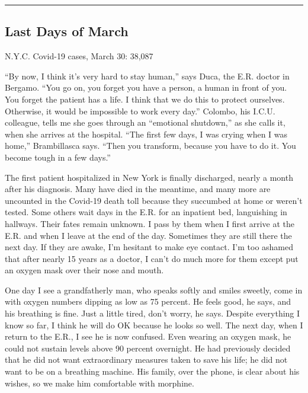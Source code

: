 \begin{center}\rule{0.5\linewidth}{\linethickness}\end{center}

\hypertarget{last-days-of-march}{%
\subsection{Last Days of March}\label{last-days-of-march}}

N.Y.C. Covid-19 cases, March 30: 38,087

``By now, I think it's very hard to stay human,'' says Duca, the E.R.
doctor in Bergamo. ``You go on, you forget you have a person, a human in
front of you. You forget the patient has a life. I think that we do this
to protect ourselves. Otherwise, it would be impossible to work every
day.'' Colombo, his I.C.U. colleague, tells me she goes through an
``emotional shutdown,'' as she calls it, when she arrives at the
hospital. ``The first few days, I was crying when I was home,''
Brambillasca says. ``Then you transform, because you have to do it. You
become tough in a few days.''

The first patient hospitalized in New York is finally discharged, nearly
a month after his diagnosis. Many have died in the meantime, and many
more are uncounted in the ­Covid-19 death toll because they succumbed at
home or weren't tested. Some others wait days in the E.R. for an
inpatient bed, languishing in hallways. Their fates remain unknown. I
pass by them when I first arrive at the E.R. and when I leave at the end
of the day. Sometimes they are still there the next day. If they are
awake, I'm hesitant to make eye contact. I'm too ashamed that after
nearly 15 years as a doctor, I can't do much more for them except put an
oxygen mask over their nose and mouth.

One day I see a grandfatherly man, who speaks softly and smiles sweetly,
come in with oxygen numbers dipping as low as 75 percent. He feels good,
he says, and his breathing is fine. Just a little tired, don't worry, he
says. Despite everything I know so far, I think he will do OK because he
looks so well. The next day, when I return to the E.R., I see he is now
confused. Even wearing an oxygen mask, he could not sustain levels above
90 percent overnight. He had previously decided that he did not want
extraordinary measures taken to save his life; he did not want to be on
a breathing machine. His family, over the phone, is clear about his
wishes, so we make him comfortable with morphine.

